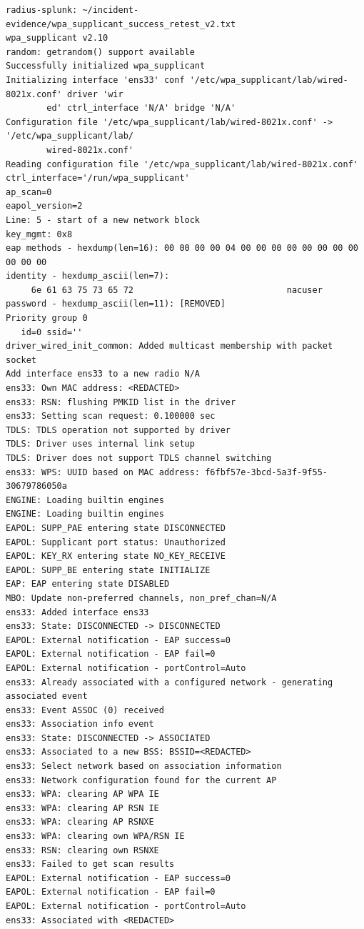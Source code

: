 \documentclass[11pt]{article}
\begin{document}
\begin{verbatim}
radius-splunk: ~/incident-evidence/wpa_supplicant_success_retest_v2.txt
wpa_supplicant v2.10
random: getrandom() support available
Successfully initialized wpa_supplicant
Initializing interface 'ens33' conf '/etc/wpa_supplicant/lab/wired-8021x.conf' driver 'wir
        ed' ctrl_interface 'N/A' bridge 'N/A'
Configuration file '/etc/wpa_supplicant/lab/wired-8021x.conf' -> '/etc/wpa_supplicant/lab/
        wired-8021x.conf'
Reading configuration file '/etc/wpa_supplicant/lab/wired-8021x.conf'
ctrl_interface='/run/wpa_supplicant'
ap_scan=0
eapol_version=2
Line: 5 - start of a new network block
key_mgmt: 0x8
eap methods - hexdump(len=16): 00 00 00 00 04 00 00 00 00 00 00 00 00 00 00 00
identity - hexdump_ascii(len=7):
     6e 61 63 75 73 65 72                              nacuser         
password - hexdump_ascii(len=11): [REMOVED]
Priority group 0
   id=0 ssid=''
driver_wired_init_common: Added multicast membership with packet socket
Add interface ens33 to a new radio N/A
ens33: Own MAC address: <REDACTED>
ens33: RSN: flushing PMKID list in the driver
ens33: Setting scan request: 0.100000 sec
TDLS: TDLS operation not supported by driver
TDLS: Driver uses internal link setup
TDLS: Driver does not support TDLS channel switching
ens33: WPS: UUID based on MAC address: f6fbf57e-3bcd-5a3f-9f55-30679786050a
ENGINE: Loading builtin engines
ENGINE: Loading builtin engines
EAPOL: SUPP_PAE entering state DISCONNECTED
EAPOL: Supplicant port status: Unauthorized
EAPOL: KEY_RX entering state NO_KEY_RECEIVE
EAPOL: SUPP_BE entering state INITIALIZE
EAP: EAP entering state DISABLED
MBO: Update non-preferred channels, non_pref_chan=N/A
ens33: Added interface ens33
ens33: State: DISCONNECTED -> DISCONNECTED
EAPOL: External notification - EAP success=0
EAPOL: External notification - EAP fail=0
EAPOL: External notification - portControl=Auto
ens33: Already associated with a configured network - generating associated event
ens33: Event ASSOC (0) received
ens33: Association info event
ens33: State: DISCONNECTED -> ASSOCIATED
ens33: Associated to a new BSS: BSSID=<REDACTED>
ens33: Select network based on association information
ens33: Network configuration found for the current AP
ens33: WPA: clearing AP WPA IE
ens33: WPA: clearing AP RSN IE
ens33: WPA: clearing AP RSNXE
ens33: WPA: clearing own WPA/RSN IE
ens33: RSN: clearing own RSNXE
ens33: Failed to get scan results
EAPOL: External notification - EAP success=0
EAPOL: External notification - EAP fail=0
EAPOL: External notification - portControl=Auto
ens33: Associated with <REDACTED>

\end{verbatim}
\end{document}
